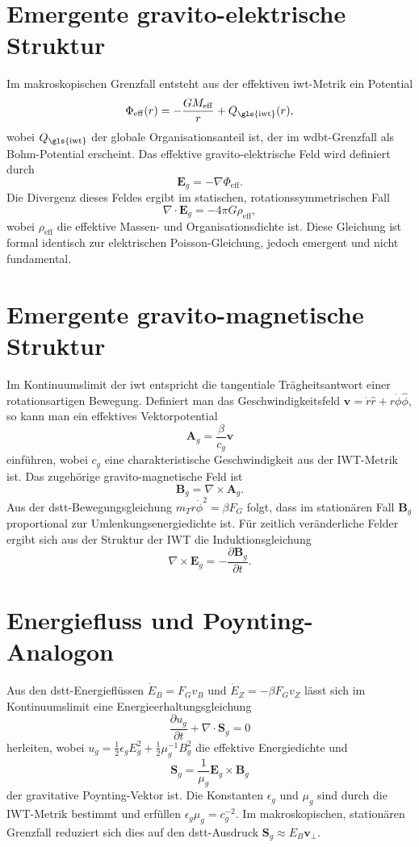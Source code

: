\section{Emergente gravito-elektrische Struktur}
Im makroskopischen Grenzfall entsteht aus der effektiven \gls{iwt}-Metrik ein Potential
\[
\Phi_{\mathrm{eff}}(r) = -\frac{G M_{\mathrm{eff}}}{r} + Q_{\mathrm{\gls{iwt}}}(r),
\]
wobei $Q_{\mathrm{\gls{iwt}}}$ der globale Organisationsanteil ist, der im \gls{wdbt}-Grenzfall als Bohm-Potential erscheint.  
Das effektive gravito-elektrische Feld wird definiert durch
\[
\mathbf{E}_g = -\nabla \Phi_{\mathrm{eff}}.
\]
Die Divergenz dieses Feldes ergibt im statischen, rotationssymmetrischen Fall
\[
\nabla \cdot \mathbf{E}_g = -4\pi G \rho_{\mathrm{eff}},
\]
wobei $\rho_{\mathrm{eff}}$ die effektive Massen- und Organisationsdichte ist. Diese Gleichung ist formal identisch zur elektrischen Poisson-Gleichung, jedoch emergent und nicht fundamental.

\section{Emergente gravito-magnetische Struktur}
Im Kontinuumslimit der \gls{iwt} entspricht die tangentiale Trägheitsantwort einer rotationsartigen Bewegung. Definiert man das Geschwindigkeitsfeld $\mathbf{v} = \dot{r}\hat{r} + r\dot{\phi}\hat{\phi}$, so kann man ein effektives Vektorpotential
\[
\mathbf{A}_g = \frac{\beta}{c_g} \mathbf{v}
\]
einführen, wobei $c_g$ eine charakteristische Geschwindigkeit aus der IWT-Metrik ist. Das zugehörige gravito-magnetische Feld ist
\[
\mathbf{B}_g = \nabla \times \mathbf{A}_g.
\]
Aus der \gls{dstt}-Bewegungsgleichung $m_T r\dot{\phi}^2 = \beta F_G$ folgt, dass im stationären Fall $\mathbf{B}_g$ proportional zur Umlenkungsenergiedichte ist.  
Für zeitlich veränderliche Felder ergibt sich aus der Struktur der IWT die Induktionsgleichung
\[
\nabla \times \mathbf{E}_g = -\frac{\partial \mathbf{B}_g}{\partial t}.
\]

\section{Energiefluss und Poynting-Analogon}
Aus den \gls{dstt}-Energieflüssen $\dot{E}_B = F_G v_B$ und $\dot{E}_Z = -\beta F_G v_Z$ lässt sich im Kontinuumslimit eine Energieerhaltungsgleichung
\[
\frac{\partial u_g}{\partial t} + \nabla \cdot \mathbf{S}_g = 0
\]
herleiten, wobei $u_g = \tfrac12 \epsilon_g E_g^2 + \tfrac12 \mu_g^{-1} B_g^2$ die effektive Energiedichte und
\[
\mathbf{S}_g = \frac{1}{\mu_g} \mathbf{E}_g \times \mathbf{B}_g
\]
der gravitative Poynting-Vektor ist. Die Konstanten $\epsilon_g$ und $\mu_g$ sind durch die IWT-Metrik bestimmt und erfüllen $\epsilon_g \mu_g = c_g^{-2}$.  
Im makroskopischen, stationären Grenzfall reduziert sich dies auf den \gls{dstt}-Ausdruck $\mathbf{S}_g \approx E_B \mathbf{v}_\perp$.

